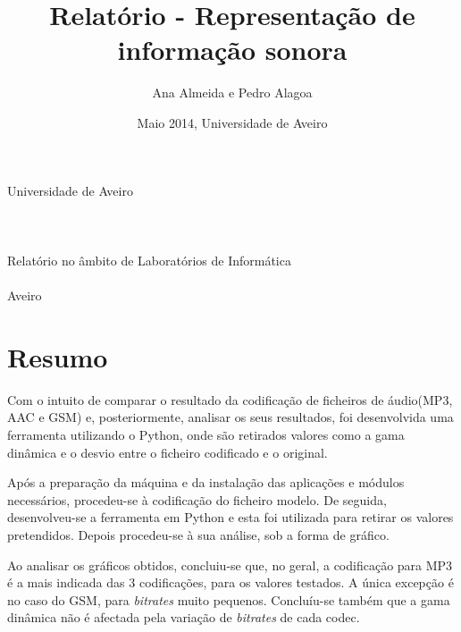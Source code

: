 \documentclass[a4paper]{report}
\title{Relatório - Representação de informação sonora}
\author{Ana Almeida e Pedro Alagoa}
\date{Maio 2014, Universidade de Aveiro}
\begin{document}
\begin{flushleft}
\begin{center}
 \Large{Universidade de Aveiro}
 \\[150pt]
 \\[75pt]
 \\
 \\[200pt]
 \flushleft \Large Relatório no âmbito de Laboratórios de Informática
 \\
 \\
 Aveiro
\end{center} 

\maketitle

\begingroup
\hypersetup{linkcolor=black}
\tableofcontents
\endgroup
\clearpage

\cleardoublepage
{}
\begingroup
\hypersetup{linkcolor=black}
\listoftables

\cleardoublepage
{}
\listoffigures
\endgroup

\clearpage

\end{flushleft}

\section{Resumo}
\label{resumo}

Com o intuito de comparar o resultado da codificação de ficheiros de áudio(\gls{MP3}, \gls{AAC} e \gls{GSM}) e, posteriormente, analisar os seus resultados, foi desenvolvida uma ferramenta utilizando o Python, onde são retirados valores como a gama dinâmica e o desvio entre o ficheiro codificado e o original.

Após a preparação da máquina e da instalação das aplicações e módulos necessários, procedeu-se à codificação do ficheiro modelo. De seguida, desenvolveu-se a ferramenta em Python e esta foi utilizada para retirar os valores pretendidos. Depois procedeu-se à sua análise, sob a forma de gráfico.

Ao analisar os gráficos obtidos, concluiu-se que, no geral, a codificação para \gls{MP3} é a mais indicada das 3 codificações, para os valores testados. A única excepção é no caso do \gls{GSM}, para \textit{bitrates} muito pequenos. Concluíu-se também que a gama dinâmica não é afectada pela variação de \textit{bitrates} de cada codec.
\end{document}
